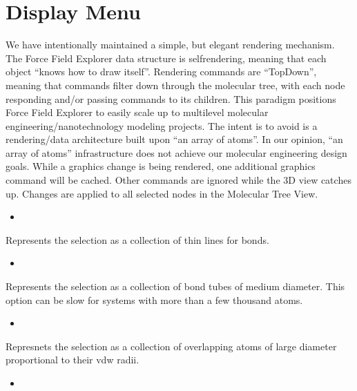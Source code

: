 \documentclass[letterpaper,11pt,english]{sphinxmanual}
\begin{document}
\section{Display Menu}
\label{\detokenize{text/menus:display-menu}}
\sphinxAtStartPar
We have intentionally maintained a simple, but elegant rendering mechanism. The Force Field Explorer data structure is self\sphinxhyphen{}rendering, meaning that each object “knows how to draw itself”. Rendering commands are “Top\sphinxhyphen{}Down”, meaning that commands filter down through the molecular tree, with each node responding and/or passing commands to its children. This paradigm positions Force Field Explorer to easily scale up to multi\sphinxhyphen{}level molecular engineering/nanotechnology modeling projects. The intent is to avoid is a rendering/data architecture built upon “an array of atoms”. In our opinion, “an array of atoms” infrastructure does not achieve our molecular engineering design goals. While a graphics change is being rendered, one additional graphics command will be cached. Other commands are ignored while the 3D view catches up. Changes are applied to all selected nodes in the Molecular Tree View.
\begin{itemize}
\item {} 
\sphinxAtStartPar
{}

\end{itemize}

\sphinxAtStartPar
Represents the selection as a collection of thin lines for bonds.
\begin{itemize}
\item {} 
\sphinxAtStartPar
{}

\end{itemize}

\sphinxAtStartPar
Represents the selection as a collection of bond tubes of medium diameter. This option can be slow for systems with more than a few thousand atoms.
\begin{itemize}
\item {} 
\sphinxAtStartPar
{}

\end{itemize}

\sphinxAtStartPar
Represnets the selection as a collection of overlapping atoms of large diameter proportional to their vdw radii.
\begin{itemize}
\item {} 
\sphinxAtStartPar
{}

\end{itemize}
\end{document}
